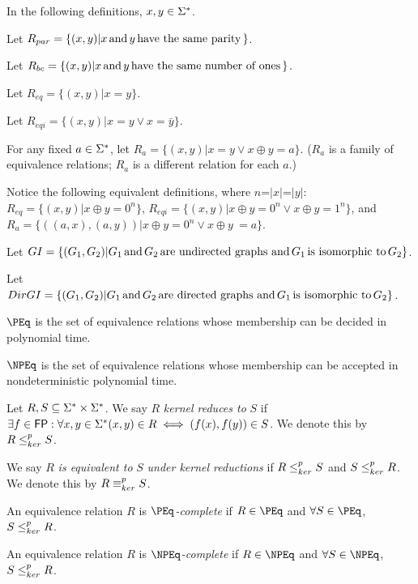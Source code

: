 In the following definitions, $x,y\in\Sigma^{*}$.

Let $R_{par}=\{(x, y)|x \,\text{and}\, y \,\text{have the same parity}\,\}$.

Let $R_{bc}=\{(x, y)|x \,\text{and}\, y \,\text{have the same number of ones}\,\}$.

Let $R_{eq}=\{(x, y)|x = y\}$.

Let $R_{eqi}=\{(x, y)|x = y \lor x = \bar{y}\}$.

For any fixed $a\in\Sigma^{*}$, let $R_{a}=\{(x, y)|x = y \lor x \oplus y =
a\}$. ($R_{a}$ is a family of equivalence relations; $R_{a}$ is a different
relation for each $a$.)

Notice the following equivalent definitions, where $n$=$|x|$=$|y|$:
$R_{eq}=\{(x, y)|x \oplus y = 0^n\}$, $R_{eqi}=\{(x, y)|x \oplus y = 0^n \lor x
\oplus y = 1^n\}$, and $R_{a}=\{((a,x),(a,y))|x \oplus y = 0^n \lor x \oplus
y\ = a\}$.

Let $GI=\{(G_1, G_2)|G_1 \,\text{and}\, G_2 \,\text{are undirected graphs and}\, G_1
\,\text{is isomorphic to}\, G_2\}$.

Let $DirGI=\{(G_1, G_2)| G_1 \,\text{and}\, G_2 \,\text{are directed graphs and}\,
G_1 \,\text{is isomorphic to}\, G_2\}$.

\begin{definition}\label{def:peq}
  \textit{$\PEq$} is the set of equivalence relations whose membership can be
  decided in polynomial time.
\end{definition}

\begin{definition}\label{def:npeq}
  \textit{$\NPEq$} is the set of equivalence relations whose membership can be
  accepted in nondeterministic polynomial time.
\end{definition}

\begin{definition}\label{def:kr}
  Let $R,S\subseteq\Sigma^{*}\times\Sigma^{*}$. We say $R$ \textit{kernel
  reduces to} $S$ if $\exists f\in{\ensuremath{\mathsf{FP}}}:\forall x,y\in\Sigma^{*} (x, y)\in R \iff
  (f(x),f(y))\in S$. We denote this by $R\leq^{p}_{ker} S$.
  
  We say $R$ \textit{is equivalent to} $S$ \textit{under kernel
  reductions} if $R\leq^{p}_{ker} S$ and $S\leq^{p}_{ker} R$. We denote this by $R\equiv^{p}_{ker}
  S$.
\end{definition}

\begin{definition}\label{def:kernel_complete}
  An equivalence relation $R$ is \textit{$\PEq$-complete} if $R\in\PEq$ and
  $\forall S\in\PEq$, $S\leq^{p}_{ker} R$.

  An equivalence relation $R$ is \textit{$\NPEq$-complete} if $R\in\NPEq$ and
  $\forall S\in\NPEq$, $S\leq^{p}_{ker} R$.
\end{definition}
